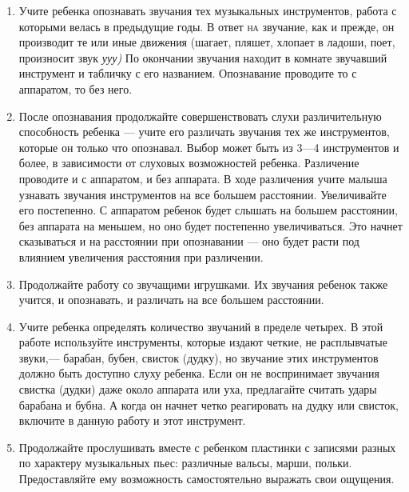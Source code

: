 \documentclass[a5paper]{book}
\renewcommand{\emph}[1]{\textit{#1}}
\begin{document}
\begin{enumerate}
\def\labelenumi{\arabic{enumi}.}
\item
  
  Учите ребенка опознавать звучания тех музыкальных инструментов, работа
  с которыми велась в предыдущие годы. В ответ \textsc{на} звучание, как
  и прежде, он производит те или иные движения (шагает, пляшет, хлопает
  в ладоши, поет, произносит звук \emph{ууу)} По окончании звучания
  находит в комнате звучавший инструмент и табличку с его названием.
  Опознавание проводите то с аппаратом, то без него.
  
\item
  
  После опознавания продолжайте совершенствовать слухи различительную
  способность ребенка --- учите его различать звучания тех же
  инструментов, которые он только что опознавал. Выбор может быть из
  3---4 инструментов и более, в зависимости от слуховых возможностей
  ребенка. Различение проводите и с аппаратом, и без аппарата. В ходе
  различения учите малыша узнавать звучания инструментов на все большем
  расстоянии. Увеличивайте его постепенно. С аппаратом ребенок будет
  слышать на большем расстоянии, без аппарата на меньшем, но оно будет
  постепенно увеличиваться. Это начнет сказываться и на расстоянии при
  опознавании --- оно будет расти под влиянием увеличения расстояния при
  различении.
  
\item
  
  Продолжайте работу со звучащими игрушками. Их звучания ребенок также
  учится, и опознавать, и различать на все большем расстоянии.
  
\item
  
  Учите ребенка определять количество звучаний в пределе четырех. В этой
  работе используйте инструменты, которые издают четкие, не расплывчатые
  звуки,--- барабан, бубен, свисток (дудку), но звучание этих
  инструментов должно быть доступно слуху ребенка. Если он не
  воспринимает звучания свистка (дудки) даже около аппарата или уха,
  предлагайте считать удары барабана и бубна. А когда он начнет четко
  реагировать на дудку или свисток, включите в данную работу и этот
  инструмент.
  
\item
  
  Продолжайте прослушивать вместе с ребенком пластинки с записями разных
  по характеру музыкальных пьес: различные вальсы, марши, польки.
  Предоставляйте ему возможность самостоятельно выражать свои ощущения.
  

\end{enumerate}
\end{document}
